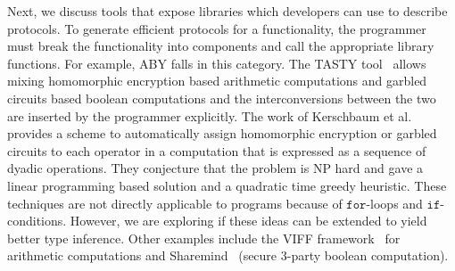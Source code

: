Next, we discuss tools that expose libraries which  developers can use to describe \mpc protocols. 
To generate efficient protocols for a functionality, the programmer must break the functionality into components and call the appropriate library functions. For example,  ABY \cite{aby} falls in this category. The TASTY tool~\cite{tasty} allows mixing homomorphic encryption based arithmetic computations 
and garbled circuits based boolean computations and the interconversions between the two are inserted by the programmer explicitly.
The work of Kerschbaum et al.~\cite{autoS} provides a scheme to automatically assign homomorphic encryption or garbled circuits to each operator in a computation that is expressed as a sequence of dyadic operations. They conjecture that the problem is NP hard and gave a linear programming based solution and a quadratic time greedy heuristic. 
These techniques are not directly applicable to \tool programs because of $\mathtt{for}$-loops and $\mathtt{if}$-conditions.
However, we are exploring if these ideas can be extended to yield better type inference.
Other examples include the VIFF framework~\cite{viff} for arithmetic computations and Sharemind~\cite{sharemind} (secure 3-party boolean computation). 

